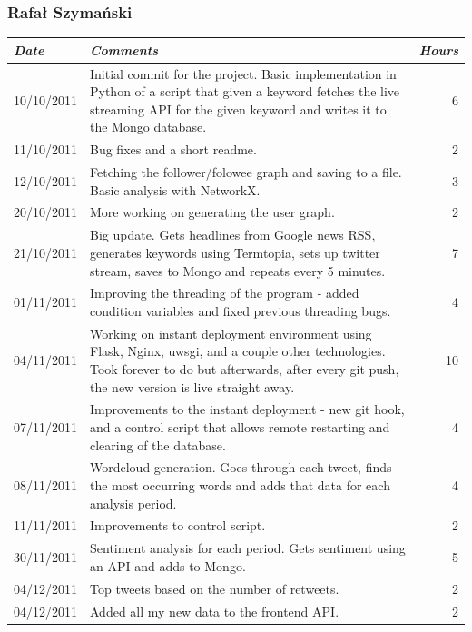 \documentclass[a4paper,12pt]{article}
\begin{document}
	  \subsubsection{Rafał Szymański}
	    \begin{tabular}{l | p{10cm} r}
	     \emph{\large Date} & \emph{\large Comments} & \emph{\large Hours}\\
	     \hline
	     10/10/2011 & Initial commit for the project. Basic implementation in Python of a script that given a keyword  fetches the live streaming API for the given keyword and writes it to the Mongo database. & 6\\
       11/10/2011 & Bug fixes and a short readme. & 2\\
       12/10/2011 & Fetching the follower/folowee graph and saving to a file. Basic analysis with NetworkX. & 3\\
       20/10/2011 & More working on generating the user graph. & 2\\
       21/10/2011 & Big update. Gets headlines from Google news RSS, generates keywords using Termtopia, sets up twitter stream, saves to Mongo and repeats every 5 minutes. & 7\\
       01/11/2011 & Improving the threading of the program - added condition variables and fixed previous threading bugs. & 4\\
       04/11/2011 & Working on instant deployment environment using Flask, Nginx, uwsgi, and a couple other technologies. Took forever to do but afterwards, after every git push, the new version is live straight away. & 10\\
       07/11/2011 & Improvements to the instant deployment - new git hook, and a control script that allows remote restarting and clearing of the database. & 4\\
       08/11/2011 & Wordcloud generation. Goes through each tweet, finds the most occurring words and adds that data for each analysis period. & 4\\
       11/11/2011 & Improvements to control script. & 2\\
       30/11/2011 & Sentiment analysis for each period. Gets sentiment using an API and adds to Mongo. & 5\\
       04/12/2011 & Top tweets based on the number of retweets. & 2\\
       04/12/2011 & Added all my new data to the frontend API. & 2
	    \end{tabular}
	  
\end{document}
